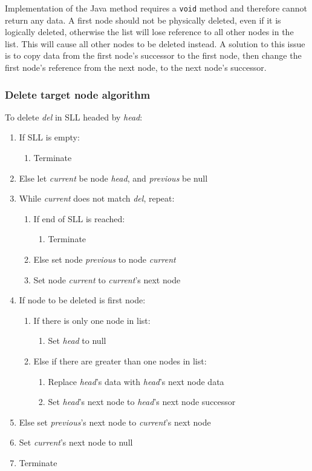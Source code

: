Implementation of the Java method requires a \texttt{void} method and therefore cannot return any data. A first node should not be physically deleted, even if it is logically deleted, otherwise the list will lose reference to all other nodes in the list. This will cause all other nodes to be deleted instead. A solution to this issue is to copy data from the first node's successor to the first node, then change the first node's reference from the next node, to the next node's successor.

\subsubsection{Delete target node algorithm}

To delete \emph{del} in SLL headed by \emph{head}:

\begin{enumerate}
\item If SLL is empty:
	\begin{enumerate}
	\item Terminate
	\end{enumerate}
\item Else let \emph{current} be node \emph{head}, and \emph{previous} be null
\item While \emph{current} does not match \emph{del}, repeat:
	\begin{enumerate}
	\item If end of SLL is reached:
		\begin{enumerate}
		\item Terminate
		\end{enumerate}
	\item Else set node \emph{previous} to node \emph{current}
	\item Set node \emph{current} to \emph{current}'s next node
	\end{enumerate}
\item If node to be deleted is first node:
	\begin{enumerate}
	\item If there is only one node in list:
		\begin{enumerate}
		\item Set \emph{head} to null
		\end{enumerate}
	\item Else if there are greater than one nodes in list:
		\begin{enumerate}
		\item Replace \emph{head}'s data with \emph{head}'s next node data
		\item Set \emph{head}'s next node to \emph{head}'s next node successor
		\end{enumerate}
	\end{enumerate}
\item Else set \emph{previous}'s next node to \emph{current}'s next node
\item Set \emph{current}'s next node to null
\item Terminate
\end{enumerate}

